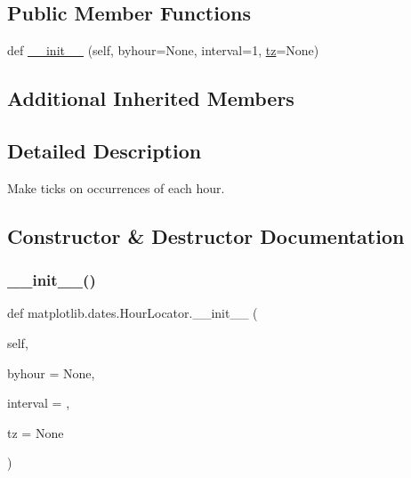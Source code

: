 \subsection*{Public Member Functions}
\begin{DoxyCompactItemize}
\item 
def \hyperlink{classmatplotlib_1_1dates_1_1HourLocator_aabf514b5d2f2bc3691c382d3c5596b9b}{\+\_\+\+\_\+init\+\_\+\+\_\+} (self, byhour=None, interval=1, \hyperlink{classmatplotlib_1_1dates_1_1DateLocator_aa18faf34dbf00ed4820535b64cd7194e}{tz}=None)
\end{DoxyCompactItemize}
\subsection*{Additional Inherited Members}


\subsection{Detailed Description}
\begin{DoxyVerb}Make ticks on occurrences of each hour.
\end{DoxyVerb}
 

\subsection{Constructor \& Destructor Documentation}
\mbox{\label{classmatplotlib_1_1dates_1_1HourLocator_aabf514b5d2f2bc3691c382d3c5596b9b}} 
\subsubsection{\texorpdfstring{\+\_\+\+\_\+init\+\_\+\+\_\+()}{\_\_init\_\_()}}
{\footnotesize\ttfamily def matplotlib.\+dates.\+Hour\+Locator.\+\_\+\+\_\+init\+\_\+\+\_\+ (\begin{DoxyParamCaption}\item[{}]{self,  }\item[{}]{byhour = {\ttfamily None},  }\item[{}]{interval = {},  }\item[{}]{tz = {\ttfamily None} }\end{DoxyParamCaption})}

